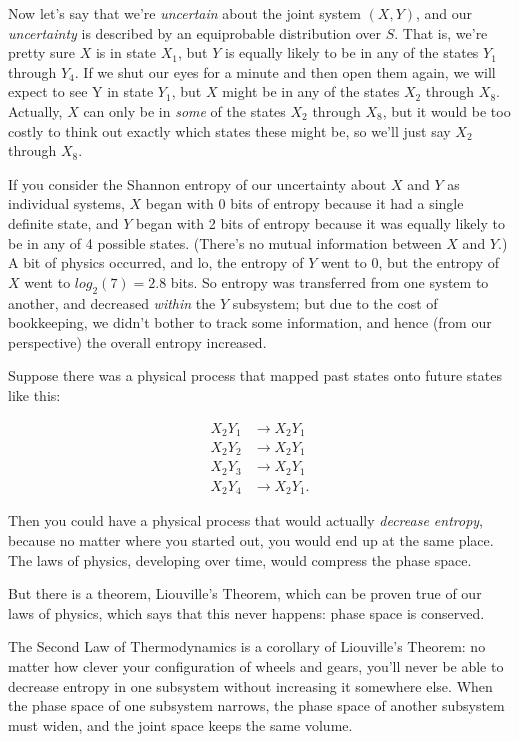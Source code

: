 {
 Now let's say that we're
\textit{uncertain} about the joint system $(X,Y)$, and our
\textit{uncertainty} is described by an equiprobable distribution over
$S$. That is, we're pretty sure $X$ is in state
$X_{1}$, but $Y$ is equally likely to be in any of the states
$Y_{1}$ through $Y_{4}$. If we shut our eyes for
a minute and then open them again, we will expect to see Y in state
$Y_{1}$, but $X$ might be in any of the states
$X_{2}$ through $X_{8}$. Actually, $X$ can only be
in \textit{some} of the states $X_{2}$ through
$X_{8}$, but it would be too costly to think out exactly
which states these might be, so we'll just say
$X_{2}$ through $X_{8}$.}

{
 If you consider the Shannon entropy of our uncertainty about $X$ and
$Y$ as individual systems, $X$ began with 0 bits of entropy because it had
a single definite state, and $Y$ began with 2 bits of entropy because it
was equally likely to be in any of 4 possible states.
(There's no mutual information between $X$ and $Y$.) A bit
of physics occurred, and lo, the entropy of $Y$ went to 0, but the
entropy of $X$ went to $log_{2}(7) = 2.8$ bits. So entropy was
transferred from one system to another, and decreased \textit{within}
the $Y$ subsystem; but due to the cost of bookkeeping, we
didn't bother to track some information, and hence
(from our perspective) the overall entropy increased.}

{
 Suppose there was a physical process that mapped past states onto
future states like this:}

\begin{align*}
 X_{2}Y_{1} &\rightarrow X_{2}Y_{1} \\
 X_{2}Y_{2} &\rightarrow X_{2}Y_{1} \\
 X_{2}Y_{3} &\rightarrow X_{2}Y_{1} \\
 X_{2}Y_{4} &\rightarrow X_{2}Y_{1}.
\end{align*}

{
 Then you could have a physical process that would actually
\textit{decrease entropy}, because no matter where you started out, you
would end up at the same place. The laws of physics, developing over
time, would compress the phase space.}

{
 But there is a theorem, Liouville's Theorem, which
can be proven true of our laws of physics, which says that this never
happens: phase space is conserved.}

{
 The Second Law of Thermodynamics is a corollary of
Liouville's Theorem: no matter how clever your
configuration of wheels and gears, you'll never be able
to decrease entropy in one subsystem without increasing it somewhere
else. When the phase space of one subsystem narrows, the phase space of
another subsystem must widen, and the joint space keeps the same
volume.}

